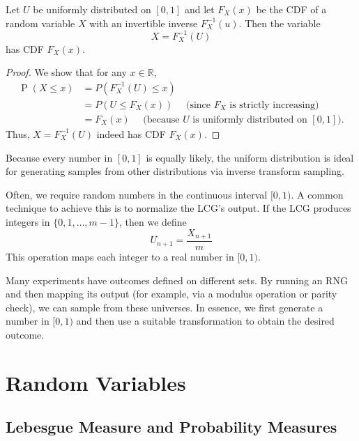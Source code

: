 \documentclass[10pt, headings=standardclasses, parskip=half, twoside]{scrartcl}
\begin{document}
\begin{theorem}
Let $U$ be uniformly distributed on $[0,1]$ and let $F_{X}(x)$ be the CDF of a random variable $X$ with an invertible inverse $F_{X}^{-1}(u)$. Then the variable
\[
X=F_{X}^{-1}(U)
\]
has CDF $F_{X}(x)$.
\end{theorem}

\begin{proof}
We show that for any $x \in \mathbb{R}$,
\[
\begin{aligned}
\operatorname{P}(X \leq x) & =P\left(F_{X}^{-1}(U) \leq x\right) \\
& =P\left(U \leq F_{X}(x)\right) \quad \text { (since } F_{X} \text { is strictly increasing) } \\
& =F_{X}(x) \quad \text { (because } U \text { is uniformly distributed on }[0,1]).
\end{aligned}
\]
Thus, $X=F_{X}^{-1}(U)$ indeed has CDF $F_{X}(x)$.
\end{proof}

Because every number in $[0,1]$ is equally likely, the uniform distribution is ideal for generating samples from other distributions via inverse transform sampling.




Often, we require random numbers in the continuous interval $[0,1)$.
A common technique to achieve this is to normalize the LCG's output.
If the LCG produces integers in $\{0,1, \ldots, m-1\}$, then we define
\[
\boxed{
U_{n+1} = \frac{X_{n+1}}{m}
}
\]
This operation maps each integer to a real number in $[0,1)$.

Many experiments have outcomes defined on different sets.
By running an RNG and then mapping its output (for example, via a modulus operation or parity check), we can sample from these universes.
In essence, we first generate a number in $[0,1)$ and then use a suitable transformation to obtain the desired outcome.


\pagebreak[2]

\section{Random Variables}

\subsection{Lebesgue Measure and Probability Measures}
\end{document}
